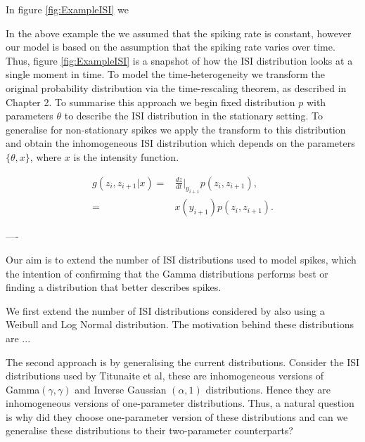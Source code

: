 \documentclass[../main.tex]{subfiles}
\begin{document}
In figure \ref{fig:ExampleISI} we 

In the above example the we assumed that the spiking rate is constant, however our model is based on the assumption that the spiking rate varies over time. Thus, figure \ref{fig:ExampleISI} is a snapshot of how the ISI distribution looks at a single moment in time. 
To model the time-heterogeneity we transform the original probability distribution via the time-rescaling theorem, as described in Chapter 2. To summarise this approach we begin fixed distribution $p$ with parameters $\theta$ to describe the ISI distribution in the stationary setting. To generalise for non-stationary spikes we apply the transform to this distribution and obtain the inhomogeneous ISI distribution which depends on the parameters $\{\theta, x\}$, where $x$ is the intensity function. 

\begin{align} \label{eq:5}
g(z_i,z_{i+1} | x) =& \frac{dz}{dt} \bigg\rvert_{y_{i+1}} p(z_i, z_{i+1}),  \\
=& x(y_{i+1}) p(z_i, z_{i+1}). \label{eq:5b}
\end{align}

----%



Our aim is to extend the number of ISI distributions used to model  spikes, which the intention of confirming that the Gamma distributions performs best or finding a distribution that better describes  spikes. 

We first extend the number of ISI distributions considered by also using a Weibull and Log Normal distribution. The motivation behind these distributions are ... 
 
The second approach is by generalising the current distributions. Consider the ISI distributions used by Titunaite et al, these are inhomogeneous versions of Gamma$(\gamma, \gamma)$ and Inverse Gaussian $(\alpha,1)$ distributions. Hence they are inhomogeneous versions of one-parameter distributions. Thus, a natural question is why did they choose one-parameter version of these distributions and can we generalise these distributions to their two-parameter counterparts?  
\end{document}
